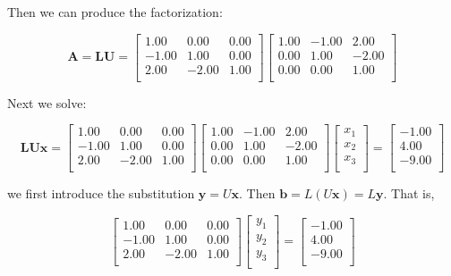 \begin{solution}
 
 Then we can produce the factorization:
 
 $$
 \mathbf A =\mathbf L \mathbf U 
=
 \begin{bmatrix} 
    1.00 &     0.00 &     0.00 \\ 
   -1.00 &     1.00 &     0.00 \\ 
    2.00 &    -2.00 &     1.00 \\ 
\end{bmatrix} 
\begin{bmatrix} 
    1.00 &    -1.00 &     2.00  \\ 
    0.00 &     1.00 &    -2.00  \\ 
    0.00 &     0.00 &     1.00  \\ 
\end{bmatrix} 
 $$
 
 
 Next we solve:
 
 
$$
\mathbf L \mathbf U \mathbf x=
\begin{bmatrix} 
    1.00 &     0.00 &     0.00 \\ 
   -1.00 &     1.00 &     0.00 \\ 
    2.00 &    -2.00 &     1.00 \\ 
\end{bmatrix} 
\begin{bmatrix} 
    1.00 &    -1.00 &     2.00  \\ 
    0.00 &     1.00 &    -2.00  \\ 
    0.00 &     0.00 &     1.00  \\ 
\end{bmatrix} 
\begin{bmatrix} 
    x_1  \\ 
    x_2  \\ 
    x_3  \\ 
\end{bmatrix}=
 \begin{bmatrix} 
   -1.00 \\ 
    4.00 \\ 
   -9.00 \\ 
\end{bmatrix} 
 $$
 
 
 we first introduce the substitution $\mathbf{y}=U \mathbf{x}$. Then $\mathbf{b}=L(U \mathbf{x})=L \mathbf{y}$. That is,
 
 
 $$
 \begin{bmatrix} 
    1.00 &     0.00 &     0.00 \\ 
   -1.00 &     1.00 &     0.00 \\ 
    2.00 &    -2.00 &     1.00 \\ 
\end{bmatrix} \begin{bmatrix} 
    y_1  \\ 
    y_2  \\ 
    y_3  \\ 
\end{bmatrix}=
 \begin{bmatrix} 
   -1.00 \\ 
    4.00 \\ 
   -9.00 \\ 
\end{bmatrix} 
$$
 

\end{solution}
